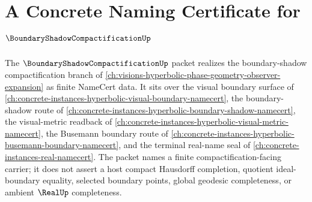 \chapter{A Concrete Naming Certificate for $\BoundaryShadowCompactificationUp$}
\label{ch:concrete-instances-boundary-shadow-compactification-namecert}

The $\BoundaryShadowCompactificationUp$ packet realizes the boundary-shadow compactification branch of \autoref{ch:visions-hyperbolic-phase-geometry-observer-expansion} as finite NameCert data. It sits over the visual boundary surface of \autoref{ch:concrete-instances-hyperbolic-visual-boundary-namecert}, the boundary-shadow route of \autoref{ch:concrete-instances-hyperbolic-boundary-shadow-namecert}, the visual-metric readback of \autoref{ch:concrete-instances-hyperbolic-visual-metric-namecert}, the Busemann boundary route of \autoref{ch:concrete-instances-hyperbolic-busemann-boundary-namecert}, and the terminal real-name seal of \autoref{ch:concrete-instances-real-namecert}. The packet names a finite compactification-facing carrier; it does not assert a host compact Hausdorff completion, quotient ideal-boundary equality, selected boundary points, global geodesic completeness, or ambient $\RealUp$ completeness.

